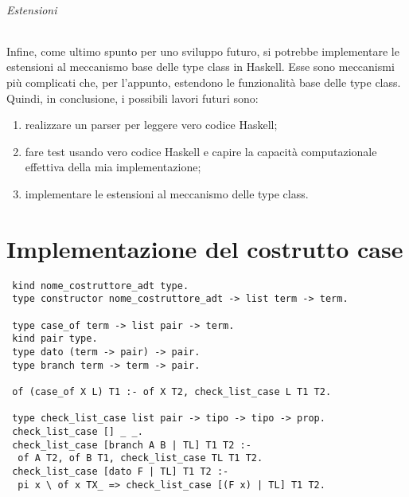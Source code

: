 \documentclass[12pt,a4paper,openright,twoside]{report}
\begin{document}
\subparagraph{Estensioni}
Infine, come ultimo spunto per uno sviluppo futuro, si potrebbe implementare le estensioni al meccanismo base delle type class in Haskell. Esse sono meccanismi più complicati che, per l'appunto, estendono le funzionalità base delle type class.\\

Quindi, in conclusione, i possibili lavori futuri sono:
\begin{enumerate}
 \item realizzare un parser per leggere vero codice Haskell;
 \item fare test usando vero codice Haskell e capire la capacità computazionale effettiva della mia implementazione;
 \item implementare le estensioni al meccanismo delle type class.
\end{enumerate}

\clearpage{\pagestyle{empty}\cleardoublepage}		%


\appendix   %



\chapter{Implementazione del costrutto case}   %
\begin{verbatim}
 kind nome_costruttore_adt type.
 type constructor nome_costruttore_adt -> list term -> term.

 type case_of term -> list pair -> term.
 kind pair type.
 type dato (term -> pair) -> pair.
 type branch term -> term -> pair.

 of (case_of X L) T1 :- of X T2, check_list_case L T1 T2.

 type check_list_case list pair -> tipo -> tipo -> prop.
 check_list_case [] _ _.
 check_list_case [branch A B | TL] T1 T2 :-
  of A T2, of B T1, check_list_case TL T1 T2.
 check_list_case [dato F | TL] T1 T2 :-
  pi x \ of x TX_ => check_list_case [(F x) | TL] T1 T2.
\end{verbatim}

\clearpage{\pagestyle{empty}\cleardoublepage}		%


\end{document}
